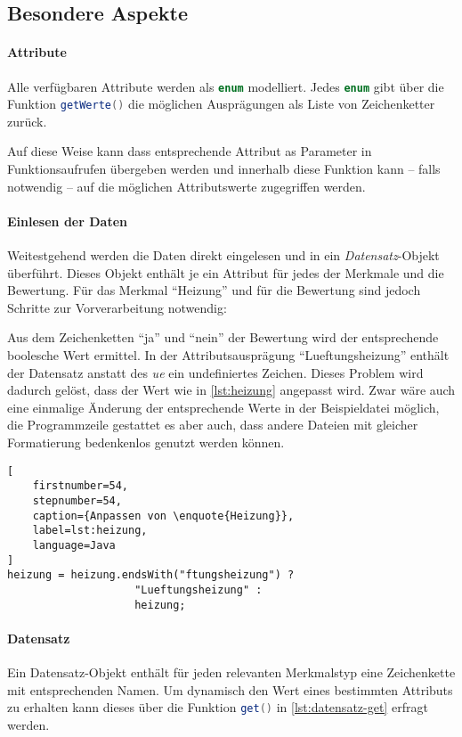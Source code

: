 \subsection{Besondere Aspekte}
\paragraph{Attribute}
Alle verfügbaren Attribute werden als \lstinline[language=Java]{enum} modelliert.
Jedes \lstinline[language=Java]{enum} gibt über die Funktion
\lstinline[language=Java]{getWerte()} die möglichen Ausprägungen als Liste von Zeichenketter zurück.

Auf diese Weise kann dass entsprechende Attribut as Parameter in Funktionsaufrufen übergeben werden und
innerhalb diese Funktion kann -- falls notwendig -- auf die möglichen Attributswerte zugegriffen werden.

\paragraph{Einlesen der Daten}
Weitestgehend werden die Daten direkt eingelesen und in ein \emph{Datensatz}-Objekt überführt.
Dieses Objekt enthält je ein Attribut für jedes der Merkmale und die Bewertung.
Für das Merkmal \enquote{Heizung} und für die Bewertung sind jedoch Schritte zur Vorverarbeitung notwendig:

Aus dem Zeichenketten \enquote{ja} und \enquote{nein} der Bewertung wird der entsprechende boolesche Wert ermittel.
In der Attributsausprägung \enquote{Lueftungsheizung} enthält der Datensatz anstatt des \textit{ue} ein undefiniertes Zeichen.
Dieses Problem wird dadurch gelöst, dass der Wert wie in \autoref{lst:heizung} angepasst wird.
Zwar wäre auch eine einmalige Änderung der entsprechende Werte in der Beispieldatei möglich,
die Programmzeile gestattet es aber auch, dass andere Dateien mit gleicher Formatierung bedenkenlos genutzt werden können.

\begin{lstlisting}[
    firstnumber=54,
    stepnumber=54,
    caption={Anpassen von \enquote{Heizung}},
    label=lst:heizung,
    language=Java
]
heizung = heizung.endsWith("ftungsheizung") ?
                    "Lueftungsheizung" :
                    heizung;
\end{lstlisting}

\paragraph{Datensatz}
Ein Datensatz-Objekt enthält für jeden relevanten Merkmalstyp eine Zeichenkette mit entsprechenden Namen.
Um dynamisch den Wert eines bestimmten Attributs zu erhalten kann dieses über die Funktion \lstinline[language=Java]{get()}
in \autoref{lst:datensatz-get} erfragt werden.

